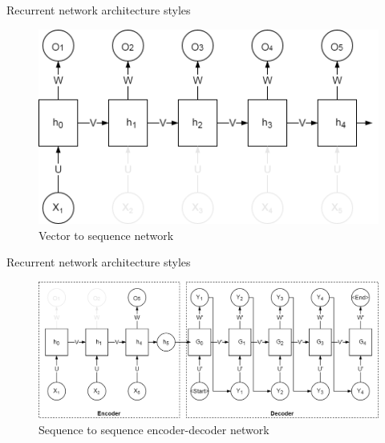\begin{frame}{Recurrent network architecture styles}
\begin{center}
	\begin{figure}
		\includegraphics[width=1\textwidth]{figures/rnn_vec_2_seq}
		\caption*{{Vector to sequence network}}
	\end{figure}
\end{center}
\end{frame}
\begin{frame}{Recurrent network architecture styles}
\begin{center}
	\begin{figure}
		\includegraphics[width=1\textwidth]{figures/rnn_seq_2_seq_encoder_decoder}
		\caption*{{Sequence to sequence encoder-decoder network}}
	\end{figure}
\end{center}
\end{frame}